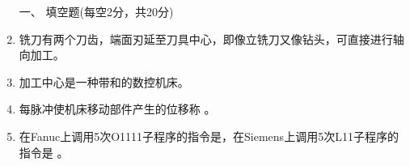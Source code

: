 \documentclass[12pt,twocolumn,landscape,UTF8,twoside]{ctexart}
\begin{document}
\begin{spacing}{1.3}
	\begin{enumerate} [1、]
		\item[\heiti 一、] {\heiti 填空题(每空2分，共20分)}
		
		
		
		
		\item {}铣刀有两个刀齿，端面刃延至刀具中心，即像立铣刀又像钻头，可直接进行轴向加工。
		
		\item 加工中心是一种带和的数控机床。


		\item 每脉冲使机床移动部件产生的位移称  		。

		


		\item 在Fanuc上调用5次O1111子程序的指令是，在Siemens上调用5次L11子程序的指令是	。

		

\end{enumerate}
\end{spacing}
\end{document}
